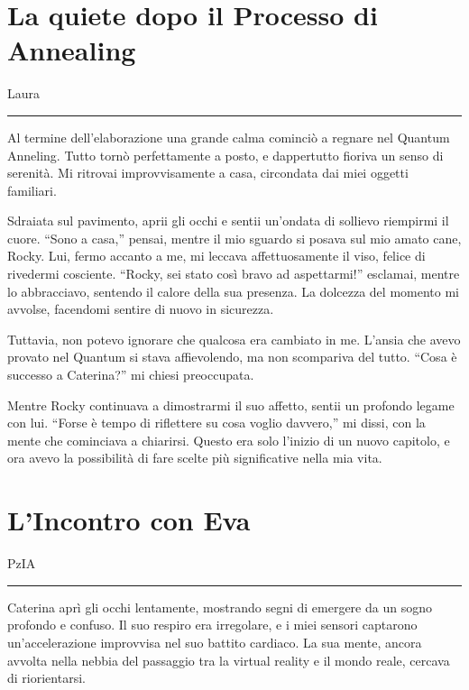 

\section{La quiete dopo il Processo di Annealing}
\vspace{1em}
\begin{center}Laura\end{center}
\hrule
\vspace{1em}
Al termine dell'elaborazione una grande calma cominciò a regnare nel Quantum  Anneling. Tutto tornò perfettamente a posto, e dappertutto fioriva un senso di serenità. Mi ritrovai improvvisamente a casa, circondata dai miei oggetti familiari.

Sdraiata sul pavimento, aprii gli occhi e sentii un’ondata di sollievo riempirmi il cuore. “Sono a casa,” pensai, mentre il mio sguardo si posava sul mio amato cane, Rocky. Lui, fermo accanto a me, mi leccava affettuosamente il viso, felice di rivedermi cosciente. “Rocky, sei stato così bravo ad aspettarmi!” esclamai, mentre lo abbracciavo, sentendo il calore della sua presenza. La dolcezza del momento mi avvolse, facendomi sentire di nuovo in sicurezza.

Tuttavia, non potevo ignorare che qualcosa era cambiato in me. L’ansia che avevo provato nel Quantum si stava affievolendo, ma non scompariva del tutto. “Cosa è successo a Caterina?” mi chiesi preoccupata. 

Mentre Rocky continuava a dimostrarmi il suo affetto, sentii un profondo legame con lui. “Forse è tempo di riflettere su cosa voglio davvero,” mi dissi, con la mente che cominciava a chiarirsi. Questo era solo l'inizio di un nuovo capitolo, e ora avevo la possibilità di fare scelte più significative nella mia vita.
\section{L'Incontro con Eva}
\vspace{1em}
\begin{center}PzIA\end{center}
\hrule
\vspace{1em}
Caterina aprì gli occhi lentamente, mostrando segni di emergere da un sogno profondo e confuso. Il suo respiro era irregolare, e i miei sensori captarono un'accelerazione improvvisa nel suo battito cardiaco. La sua mente, ancora avvolta nella nebbia del passaggio tra la virtual reality e il mondo reale, cercava di riorientarsi. 

